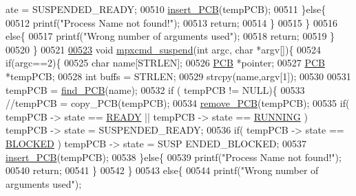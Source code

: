 \begin{DoxyCode}
{      ate = SUSPENDED\_READY;
00510                         \hyperlink{mpx__r2_8c_aa3b334e3a5afd6e590917667ad359a6f}{insert_PCB}(tempPCB);
00511                 \}\textcolor{keywordflow}{else}\{
00512                         printf(\textcolor{stringliteral}{"Process Name not found!"});
00513                         \textcolor{keywordflow}{return};
00514                 \}
00515         \}
00516         \textcolor{keywordflow}{else}\{
00517                 printf(\textcolor{stringliteral}{"Wrong number of arguments used"});       
00518                 \textcolor{keywordflow}{return};
00519         \}
00520 \}
00521 
\hypertarget{mpx__r2_8c_source_l00523}{}\hyperlink{mpx__r2_8h_a697f0f432dba18606d9e514eda9cd073}{00523} \textcolor{keywordtype}{void} \hyperlink{mpx__r2_8c_a697f0f432dba18606d9e514eda9cd073}{mpxcmd_suspend}(\textcolor{keywordtype}{int} argc, \textcolor{keywordtype}{char} *argv[])\{
00524         \textcolor{keywordflow}{if}(argc==2)\{
00525                 \textcolor{keywordtype}{char} name[STRLEN];
00526                 \hyperlink{structprocess}{PCB} *pointer;
00527                 \hyperlink{structprocess}{PCB} *tempPCB;
00528                 \textcolor{keywordtype}{int} buffs = STRLEN;
00529                 strcpy(name,argv[1]);
00530                 
00531                 tempPCB = \hyperlink{mpx__r2_8c_a612a6abcb66c688a32f33abc93ff3990}{find_PCB}(name);
00532                 \textcolor{keywordflow}{if} ( tempPCB != NULL)\{
00533                         \textcolor{comment}{//tempPCB = copy\_PCB(tempPCB);}
00534                         \hyperlink{mpx__r2_8c_af30a3658210d449b4b53e5be2ed2bc2e}{remove_PCB}(tempPCB);
00535                         \textcolor{keywordflow}{if}( tempPCB -> state == \hyperlink{mpx__r2_8h_ad1235d5ce36f7267285e82dccd428aa6}{READY} || tempPCB -> state == 
      \hyperlink{mpx__r2_8h_a6fb7181d994ee98e735494be55809708}{RUNNING} ) tempPCB -> state = SUSPENDED\_READY;
00536                         \textcolor{keywordflow}{if}( tempPCB -> state == \hyperlink{mpx__r2_8h_a48f6457243719e7031768d4100741159}{BLOCKED} ) tempPCB -> state = SUSP
      ENDED\_BLOCKED;
00537                         \hyperlink{mpx__r2_8c_aa3b334e3a5afd6e590917667ad359a6f}{insert_PCB}(tempPCB);
00538                 \}\textcolor{keywordflow}{else}\{
00539                         printf(\textcolor{stringliteral}{"Process Name not found!"});
00540                         \textcolor{keywordflow}{return};
00541                 \}
00542         \}
00543         \textcolor{keywordflow}{else}\{
00544                 printf(\textcolor{stringliteral}{"Wrong number of arguments used"});       
}
\end{DoxyCode}
